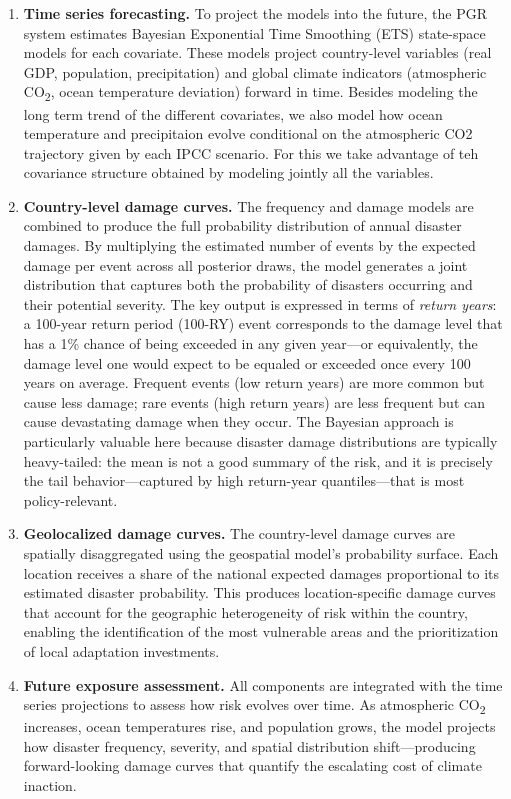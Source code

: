 \documentclass[11pt,a4paper]{article}
\begin{document}
\begin{enumerate}[leftmargin=2em]
  \item \textbf{Time series forecasting.} To project the models into the future, the PGR system estimates Bayesian Exponential Time Smoothing (ETS) state-space models for each covariate. These models project country-level variables (real GDP, population, precipitation) and global climate indicators (atmospheric CO\textsubscript{2}, ocean temperature deviation) forward in time. Besides modeling the long term trend of the different covariates, we also model how ocean temperature and precipitaion evolve conditional on the atmospheric CO2 trajectory given by each IPCC scenario. For this we take advantage of teh covariance structure obtained by modeling jointly all the variables.

  \item \textbf{Country-level damage curves.} The frequency and damage models are combined to produce the full probability distribution of annual disaster damages. By multiplying the estimated number of events by the expected damage per event across all posterior draws, the model generates a joint distribution that captures both the probability of disasters occurring and their potential severity. The key output is expressed in terms of \textit{return years}: a 100-year return period (100-RY) event corresponds to the damage level that has a 1\% chance of being exceeded in any given year---or equivalently, the damage level one would expect to be equaled or exceeded once every 100 years on average. Frequent events (low return years) are more common but cause less damage; rare events (high return years) are less frequent but can cause devastating damage when they occur. The Bayesian approach is particularly valuable here because disaster damage distributions are typically heavy-tailed: the mean is not a good summary of the risk, and it is precisely the tail behavior---captured by high return-year quantiles---that is most policy-relevant.

  \item \textbf{Geolocalized damage curves.} The country-level damage curves are spatially disaggregated using the geospatial model's probability surface. Each location receives a share of the national expected damages proportional to its estimated disaster probability. This produces location-specific damage curves that account for the geographic heterogeneity of risk within the country, enabling the identification of the most vulnerable areas and the prioritization of local adaptation investments.

  \item \textbf{Future exposure assessment.} All components are integrated with the time series projections to assess how risk evolves over time. As atmospheric CO\textsubscript{2} increases, ocean temperatures rise, and population grows, the model projects how disaster frequency, severity, and spatial distribution shift---producing forward-looking damage curves that quantify the escalating cost of climate inaction.
\end{enumerate}
\end{document}
